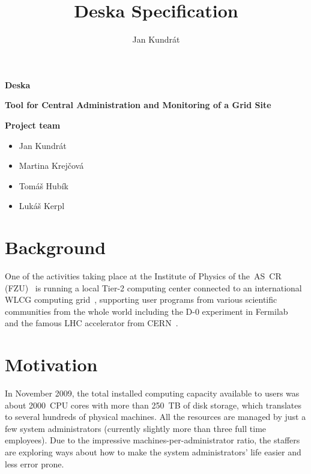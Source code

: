 \documentclass[12pt]{article}
\author{Jan Kundrát}
\title{Deska Specification}
\begin{document}
{\Huge \textbf{Deska}}

\vspace{0.2in}

{\large \textbf{Tool for Central Administration and Monitoring of a Grid Site}}

\vspace{0.5in}

{\large \textbf{Project team}}
\begin{itemize}
	\item Jan Kundrát
	\item Martina Krejčová
	\item Tomáš Hubík
	\item Lukáš Kerpl
\end{itemize}

\vspace{0.1in}

\tableofcontents

\vspace{0.3in}

\section{Background}

One of the activities taking place at the Institute of Physics of the~AS~CR (FZU)~\cite{fzu} is running a local Tier-2 computing
center connected to an international WLCG computing grid~\cite{wlcg}, supporting user programs from various scientific communities
from the whole world including the D-0 experiment in Fermilab~\cite{d0} and the famous LHC accelerator from CERN~\cite{lhc}.

\section{Motivation}

In November 2009, the total installed computing capacity available to users was about 2000~CPU cores with more than 250~TB of disk
storage, which translates to several hundreds of physical machines.  All the resources are managed by just a few system
administrators (currently slightly more than three full time employees).  Due to the impressive machines-per-administrator ratio,
the staffers are exploring ways about how to make the system administrators' life easier and less error prone.
\end{document}
